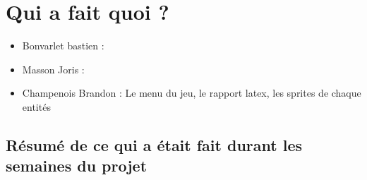 \documentclass[a4paper, 11pt]{article}
\begin{document}
\section{Qui a fait quoi ?}

\begin{itemize}
\item Bonvarlet bastien :\\
\item Masson Joris : \\
\item Champenois Brandon : Le menu du jeu, le rapport latex, les sprites de chaque entités
\end{itemize}

\subsection{Résumé de ce qui a était fait durant les semaines du projet}
\end{document}
